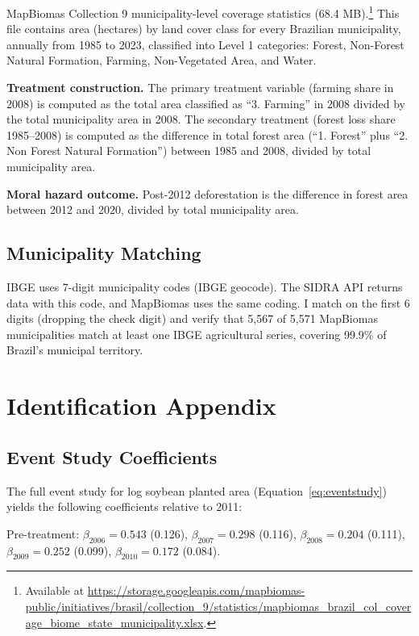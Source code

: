 \documentclass[12pt]{article}
\begin{document}
MapBiomas Collection 9 municipality-level coverage statistics (68.4 MB).\footnote{Available at \url{https://storage.googleapis.com/mapbiomas-public/initiatives/brasil/collection_9/statistics/mapbiomas_brazil_col_coverage_biome_state_municipality.xlsx}.} This file contains area (hectares) by land cover class for every Brazilian municipality, annually from 1985 to 2023, classified into Level 1 categories: Forest, Non-Forest Natural Formation, Farming, Non-Vegetated Area, and Water.

\textbf{Treatment construction.} The primary treatment variable (farming share in 2008) is computed as the total area classified as ``3. Farming'' in 2008 divided by the total municipality area in 2008. The secondary treatment (forest loss share 1985--2008) is computed as the difference in total forest area (``1. Forest'' plus ``2. Non Forest Natural Formation'') between 1985 and 2008, divided by total municipality area.

\textbf{Moral hazard outcome.} Post-2012 deforestation is the difference in forest area between 2012 and 2020, divided by total municipality area.

\subsection{Municipality Matching}

IBGE uses 7-digit municipality codes (IBGE geocode). The SIDRA API returns data with this code, and MapBiomas uses the same coding. I match on the first 6 digits (dropping the check digit) and verify that 5,567 of 5,571 MapBiomas municipalities match at least one IBGE agricultural series, covering 99.9\% of Brazil's municipal territory.


\section{Identification Appendix}

\subsection{Event Study Coefficients}

The full event study for log soybean planted area (Equation~\ref{eq:eventstudy}) yields the following coefficients relative to 2011:

Pre-treatment: $\beta_{2006} = 0.543$ (0.126), $\beta_{2007} = 0.298$ (0.116), $\beta_{2008} = 0.204$ (0.111), $\beta_{2009} = 0.252$ (0.099), $\beta_{2010} = 0.172$ (0.084).
\end{document}
